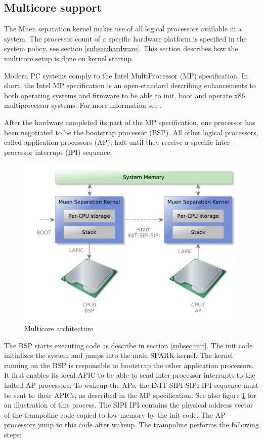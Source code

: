 \subsection{Multicore support}\label{subsec:mp-support}
The Muen separation kernel makes use of all logical processors available in a
system. The processor count of a specific hardware platform is specified in the
system policy, see section \ref{subsec:hardware}. This section describes how the
multicore setup is done on kernel startup.

Modern PC systems comply to the Intel MultiProcessor (MP)
specification. In short, the Intel MP specification is an open-standard
describing enhancements to both operating systems and firmware to be able to
init, boot and operate x86 multiprocessor systems. For more information see
\cite{intel:mp}.

After the hardware completed its part of the MP specification, one processor
has been negotiated to be the bootstrap processor (BSP). All other
logical processors, called application processors (AP), halt until
they receive a specific inter-processor interrupt (IPI) sequence.

\begin{figure}[h]
	\centering
	\includegraphics[scale=0.6]{images/mp-overview}
	\caption{Multicore architecture}
	\label{fig:mp-overview}
\end{figure}

The BSP starts executing code as describe in section \ref{subsec:init}. The
init code initializes the system and jumps into the main SPARK kernel. The
kernel running on the BSP is responsible to bootstrap the other application
processors. It first enables its local APIC to be able to send
inter-processor interrupts to the halted AP processors. To wakeup the APs, the
INIT-SIPI-SIPI IPI sequence must be sent to their APICs, as described in the MP
specification. See also figure \ref{fig:mp-overview} for an illustration of
this process. The SIPI IPI contains the physical address vector of the
trampoline code copied to low-memory by the init code. The AP processors jump
to this code after wakeup. The trampoline performs the following steps:


